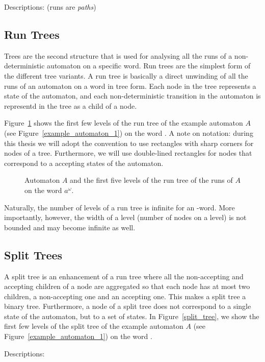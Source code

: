 Descriptions: \cite{fogarty2013unifying} (runs are \textit{paths})~\cite{2014_wilke}

\subsection{Run Trees}
Trees are the second structure that is used for analysing all the runs of a non-deterministic automaton on a specific word. Run trees are the simplest form of the different tree variants. A run tree is basically a direct unwinding of all the runs of an automaton on a word in tree form. Each node in the tree represents a state of the automaton, and each non-deterministic transition in the automaton is representd in the tree as a child of a node.

Figure~\ref{run_tree} shows the first few levels of the run tree of the example automaton $A$ (see Figure~\ref{example_automaton_1}) on the word \aom. A note on notation: during this thesis we will adopt the convention to use rectangles with sharp corners for nodes of a tree. Furthermore, we will use double-lined rectangles for nodes that correspond to a accepting states of the automaton.

\begin{figure}
\centering
\RunTree
\caption{Automaton $A$ and the first five levels of the run tree of the runs of $A$ on the word $a^\omega$.}
\label{run_tree}
\end{figure}

Naturally, the number of levels of a run tree is infinite for an \om-word. More importantly, however, the width of a level (number of nodes on a level) is not bounded and may become infinite as well. 



\subsection{Split Trees}
A split tree is an enhancement of a run tree where all the non-accepting and accepting children of a node are aggregated so that each node has at most two children, a non-accepting one and an accepting one. This makes a split tree a binary tree. Furthermore, a node of a split tree does not correspond to a single state of the automaton, but to a set of states. In Figure~\ref{split_tree}, we show the first few levels of the split tree of the example automaton $A$ (see Figure~\ref{example_automaton_1}) on the word \aom.

Descriptions: \cite{vardi2007automata}

